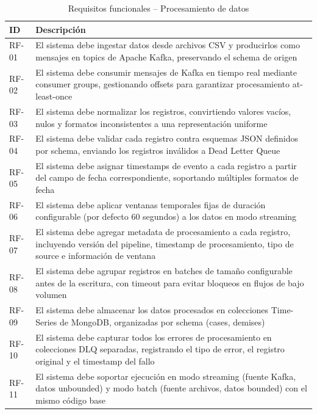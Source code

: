 \documentclass[12pt,a4paper]{article}
\begin{document}
\begin{table}[H]
    \centering
    \caption{Requisitos funcionales -- Procesamiento de datos}
    \begin{tabular}{@{}p{1.5cm}p{12cm}@{}}
        \toprule
        \textbf{ID} & \textbf{Descripción}                                                                                                                                                    \\
        \midrule
        RF-01       & El sistema debe ingestar datos desde archivos CSV y producirlos como mensajes en topics de Apache Kafka, preservando el schema de origen                                \\
        RF-02       & El sistema debe consumir mensajes de Kafka en tiempo real mediante consumer groups, gestionando offsets para garantizar procesamiento at-least-once                     \\
        RF-03       & El sistema debe normalizar los registros, convirtiendo valores vacíos, nulos y formatos inconsistentes a una representación uniforme                                    \\
        RF-04       & El sistema debe validar cada registro contra esquemas JSON definidos por schema, enviando los registros inválidos a Dead Letter Queue                                   \\
        RF-05       & El sistema debe asignar timestamps de evento a cada registro a partir del campo de fecha correspondiente, soportando múltiples formatos de fecha                        \\
        RF-06       & El sistema debe aplicar ventanas temporales fijas de duración configurable (por defecto 60 segundos) a los datos en modo streaming                                      \\
        RF-07       & El sistema debe agregar metadata de procesamiento a cada registro, incluyendo versión del pipeline, timestamp de procesamiento, tipo de source e información de ventana \\
        RF-08       & El sistema debe agrupar registros en batches de tamaño configurable antes de la escritura, con timeout para evitar bloqueos en flujos de bajo volumen                   \\
        RF-09       & El sistema debe almacenar los datos procesados en colecciones Time-Series de MongoDB, organizadas por schema (cases, demises)                                           \\
        RF-10       & El sistema debe capturar todos los errores de procesamiento en colecciones DLQ separadas, registrando el tipo de error, el registro original y el timestamp del fallo   \\
        RF-11       & El sistema debe soportar ejecución en modo streaming (fuente Kafka, datos unbounded) y modo batch (fuente archivos, datos bounded) con el mismo código base             \\
        \bottomrule
    \end{tabular}
\end{table}
\end{document}
